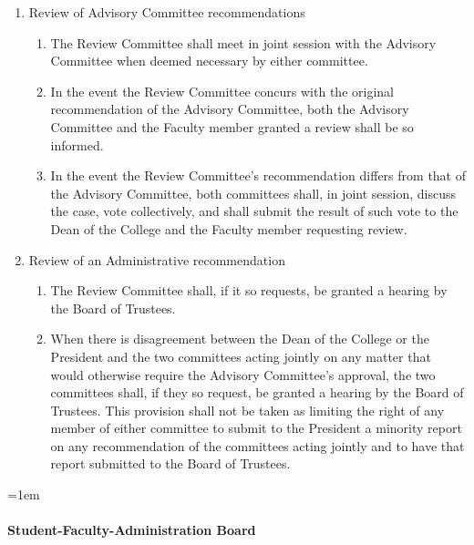 \documentclass{manual}
\let\oldparagraph\paragraph
\renewcommand\paragraph{\leftskip=1em\oldparagraph}
\newcommand{\itemLevelA}{\alph*.}
\newcommand{\itemLevelB}{\arabic*)}
\newcommand{\itemLevelC}{\alph*)}
\newcommand{\itemRefA}{\alph*}
\newcommand{\itemRefB}{\arabic*}
\newcommand{\itemRefC}{\alph*}
\begin{document}
\begin{enumerate}[label=\itemLevelA,ref=\itemRefA]
\begin{enumerate}[label=\itemLevelB,ref=\itemRefB]
\item Review of Advisory Committee recommendations

\begin{enumerate}[label=\itemLevelC,ref=\itemRefC]

\item The Review Committee shall meet in joint session with the Advisory Committee when deemed necessary by either committee.

\item In the event the Review Committee concurs with the original recommendation of the Advisory Committee, both the Advisory Committee and the Faculty member granted a review shall be so informed.

\item In the event the Review Committee's recommendation differs from that of the Advisory Committee, both committees shall, in joint session, discuss the case, vote collectively, and shall submit the result of such vote to the Dean of the College and the Faculty member requesting review.

\end{enumerate}


\item Review of an Administrative recommendation
\begin{enumerate}[label=\itemLevelC,ref=\itemRefC]

\item The Review Committee shall, if it so requests, be granted a hearing by the Board of Trustees.

\item When there is disagreement between the Dean of the College or the President and the two committees acting jointly on any matter that would otherwise require the Advisory Committee's approval, the two committees shall, if they so request, be granted a hearing by the Board of Trustees. This provision shall not be taken as limiting the right of any member of either committee to submit to the President a minority report on any recommendation of the committees acting jointly and to have that report submitted to the Board of Trustees.

\end{enumerate}

\end{enumerate}
\end{enumerate}


\paragraph{Student-Faculty-Administration Board}
\end{document}
